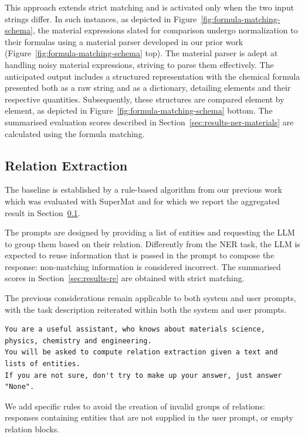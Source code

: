 \documentclass[a4paper]{article}
\begin{document}
This approach extends strict matching and is activated only when the two input strings differ. In such instances, as depicted in Figure~\ref{fig:formula-matching-schema}, the material expressions slated for comparison undergo normalization to their formulas using a material parser developed in our prior work~\cite{lfoppiano2023automatic} (Figure~\ref{fig:formula-matching-schema} top). The material parser is adept at handling noisy material expressions, striving to parse them effectively. The anticipated output includes a structured representation with the chemical formula presented both as a raw string and as a dictionary, detailing elements and their respective quantities. Subsequently, these structures are compared element by element, as depicted in Figure~\ref{fig:formula-matching-schema} bottom.
The summarised evaluation scores described in Section~\ref{sec:results-ner-materials} are calculated using the formula matching. 

\subsection{Relation Extraction}
\label{sec:re}
The baseline is established by a rule-based algorithm from our previous work~\cite{lfoppiano2023automatic} which was evaluated with SuperMat and for which we report the aggregated result in Section~\ref{sec:re}. 

The prompts are designed by providing a list of entities and requesting the LLM to group them based on their relation. 
Differently from the NER task, the LLM is expected to reuse information that is passed in the prompt to compose the response: non-matching information is considered incorrect.
The summarised scores in Section~\ref{sec:results-re} are obtained with strict matching. 

The previous considerations remain applicable to both system and user prompts, with the task description reiterated within both the system and user prompts. 

\begin{lstlisting}[caption=System prompt for RE modified by emphasising the tasks]
You are a useful assistant, who knows about materials science, physics, chemistry and engineering.
You will be asked to compute relation extraction given a text and lists of entities. 
If you are not sure, don't try to make up your answer, just answer "None". 
\end{lstlisting}

We add specific rules to avoid the creation of invalid groups of relations: responses containing entities that are not supplied in the user prompt, or empty relation blocks. 
\end{document}
